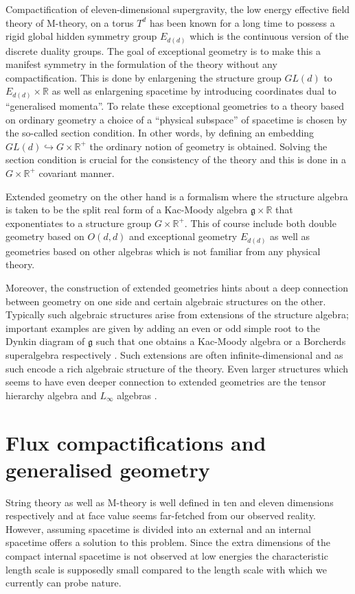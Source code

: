 Compactification of eleven-dimensional supergravity, the low energy effective field theory of M-theory, on a torus $T^d$ has been known for a long time to possess a rigid global hidden symmetry group $E_{d(d)}$\cite{CREMMER197848,Cremmer:1997ct} which is the continuous version of the discrete duality groups. The goal of exceptional geometry is to make this a manifest symmetry in the formulation of the theory without any compactification. This is done by enlargening the structure group $GL(d)$ to $E_{d(d)}\times\mathbb{R}$ as well as enlargening spacetime by introducing coordinates dual to ``generalised momenta''. To relate these exceptional geometries to a theory based on ordinary geometry a choice of a ``physical subspace'' of spacetime is chosen by the so-called section condition. In other words, by defining an embedding $GL(d)\hookrightarrow G\times\mathbb{R}^+$ the ordinary notion of geometry is obtained. Solving the section condition is crucial for the consistency of the theory and this is done in a $G\times\mathbb{R}^+$ covariant manner. 

Extended geometry \cite{CederwallPalmkvist2017} on the other hand is a formalism where the structure algebra is taken to be the split real form of a Kac-Moody algebra $\mathfrak{g}\times\mathbb{R}$ that exponentiates to a structure group $G\times \mathbb{R}^+$. This of course include both double geometry based on $O(d,d)$ and exceptional geometry $E_{d(d)}$ as well as geometries based on other algebras which is not familiar from any physical theory. 

Moreover, the construction of extended geometries hints about a deep connection between geometry on one side and certain algebraic structures on the other. Typically such algebraic structures arise from extensions of the structure algebra; important examples are given by adding an even or odd simple root to the Dynkin diagram of $\mathfrak{g}$ such that one obtains a Kac-Moody algebra or a Borcherds superalgebra respectively \cite{Palmkvist2015ExpGeomSuperAlg,CederwallPalmkvistSuperalgebras2015}. Such extensions are often infinite-dimensional and as such encode a rich algebraic structure of the theory. Even larger structures which seems to have even deeper connection to extended geometries are the tensor hierarchy algebra \cite{Palmkvist:2013vya,Carbone:2018njd} and $L_\infty$ algebras \cite{Cederwall:2018aab,Hohm:2017pnh}.


\section{Flux compactifications and generalised geometry}
String theory as well as M-theory is well defined in ten and eleven dimensions respectively and at face value seems far-fetched from our observed reality. However, assuming spacetime is divided into an external and an internal spacetime offers a solution to this problem. Since the extra dimensions of the compact internal spacetime is not observed at low energies the characteristic length scale is supposedly small compared to the length scale with which we currently can probe nature.

